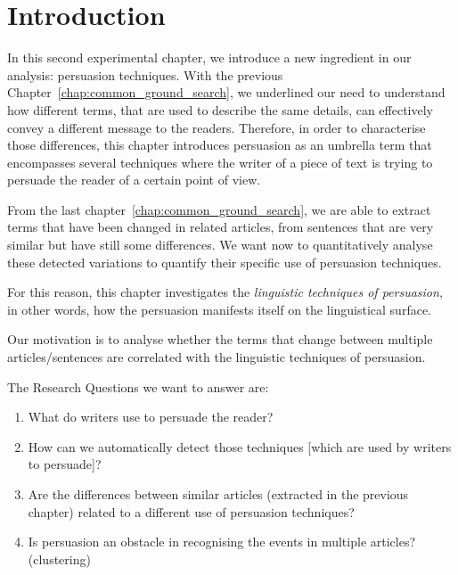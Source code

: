 \label{chap:linguistic_persuasion}

\section{\statusgreen Introduction}
\label{sec:lp_intro}

In this second experimental chapter, we introduce a new ingredient in our analysis: persuasion techniques.
With the previous Chapter~\ref{chap:common_ground_search}, we underlined our need to understand how different terms, that are used to describe the same details, can effectively convey a different message to the readers.
Therefore, in order to characterise those differences, this chapter introduces \gls{persuasion} as an umbrella term that encompasses several techniques where the writer of a piece of text is trying to persuade the reader of a certain point of view.

From the last chapter~\ref{chap:common_ground_search}, 
we are able to extract terms that have been changed in related articles, from sentences that are very similar but have still some differences.
We want now to quantitatively analyse these detected variations to quantify their specific use of persuasion techniques.

For this reason, this chapter investigates the \emph{linguistic techniques of persuasion}, in other words, how the persuasion manifests itself on the linguistical surface.

Our motivation is to analyse whether the terms that change between multiple articles/sentences are correlated with the linguistic techniques of persuasion.

The Research Questions we want to answer are: 
\begin{enumerate}
    \item What do writers use to persuade the reader?
    \item How can we automatically detect those techniques [which are used by writers to persuade]? %
    \item Are the differences between similar articles (extracted in the previous chapter) related to a different use of persuasion techniques? %
    \item Is persuasion an obstacle in recognising the events in multiple articles? (clustering)
\end{enumerate}


